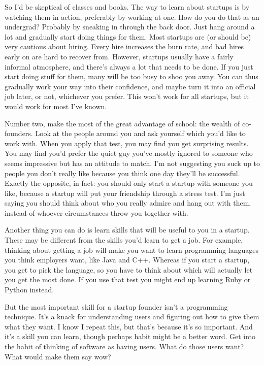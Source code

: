 \documentclass[12pt]{book}
\begin{document}
So I'd be skeptical of classes and books. The way to learn about
startups is by watching them in action, preferably by working at one.
How do you do that as an undergrad? Probably by sneaking in through the
back door. Just hang around a lot and gradually start doing things for
them. Most startups are (or should be) very cautious about hiring. Every
hire increases the burn rate, and bad hires early on are hard to recover
from. However, startups usually have a fairly informal atmosphere, and
there's always a lot that needs to be done. If you just start doing
stuff for them, many will be too busy to shoo you away. You can thus
gradually work your way into their confidence, and maybe turn it into an
official job later, or not, whichever you prefer. This won't work for
all startups, but it would work for most I've known.

Number two, make the most of the great advantage of school: the wealth
of co-founders. Look at the people around you and ask yourself which
you'd like to work with. When you apply that test, you may find you get
surprising results. You may find you'd prefer the quiet guy you've
mostly ignored to someone who seems impressive but has an attitude to
match. I'm not suggesting you suck up to people you don't really like
because you think one day they'll be successful. Exactly the opposite,
in fact: you should only start a startup with someone you like, because
a startup will put your friendship through a stress test. I'm just
saying you should think about who you really admire and hang out with
them, instead of whoever circumstances throw you together with.

Another thing you can do is learn skills that will be useful to you in a
startup. These may be different from the skills you'd learn to get a
job. For example, thinking about getting a job will make you want to
learn programming languages you think employers want, like Java and C++.
Whereas if you start a startup, you get to pick the language, so you
have to think about which will actually let you get the most done. If
you use that test you might end up learning Ruby or Python instead.

But the most important skill for a startup founder isn't a programming
technique. It's a knack for understanding users and figuring out how to
give them what they want. I know I repeat this, but that's because it's
so important. And it's a skill you can learn, though perhaps habit might
be a better word. Get into the habit of thinking of software as having
users. What do those users want? What would make them say wow?
\end{document}
